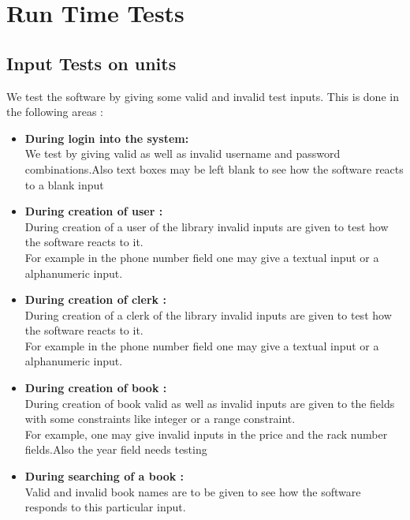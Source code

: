 \documentclass{article}
\begin{document}
\section{Run Time Tests}
\subsection{Input Tests on units}
We test the software by giving some valid and invalid test inputs.
This is done in the following areas :\\
\begin{itemize}
	\item \textbf{During login into the system:}\\
	We test by giving valid as well as invalid username and password combinations.Also text boxes may be left blank to see how the software reacts to a blank input
	
	\item \textbf{During creation of user :}\\
	During creation of a user of the library invalid inputs are given to test how the software reacts to it.\\
	For example in the phone number field one may give a textual input or a alphanumeric input.
	
	\item \textbf{During creation of clerk :}\\
	During creation of a clerk of the library invalid inputs are given to test how the software reacts to it.\\
	For example in the phone number field one may give a textual input or a alphanumeric input.
	
	\item \textbf{During creation of book :}\\
	During creation of book valid as well as invalid inputs are given to the fields with some constraints like integer or a range constraint.\\
	For example, one may give invalid inputs in the price and the rack number fields.Also the year field needs testing
	
	\item \textbf{During searching of a book :}\\
	Valid and invalid book names are to be given to see how the software responds to this particular input.
	
\end{itemize}
\end{document}
